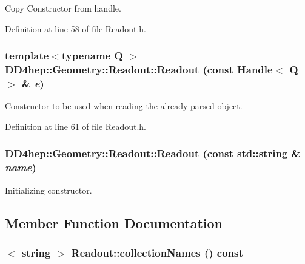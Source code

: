 Copy Constructor from handle. 

Definition at line 58 of file Readout.h.\hypertarget{class_d_d4hep_1_1_geometry_1_1_readout_a705069ce0237484eb95a9134df946698}{
\subsubsection[{Readout}]{\setlength{\rightskip}{0pt plus 5cm}template$<$typename Q $>$ DD4hep::Geometry::Readout::Readout (const {\bf Handle}$<$ Q $>$ \& {\em e})}}
\label{class_d_d4hep_1_1_geometry_1_1_readout_a705069ce0237484eb95a9134df946698}


Constructor to be used when reading the already parsed object. 

Definition at line 61 of file Readout.h.\hypertarget{class_d_d4hep_1_1_geometry_1_1_readout_ad8822b93a8d52c61b848323a5cea203d}{
\subsubsection[{Readout}]{\setlength{\rightskip}{0pt plus 5cm}DD4hep::Geometry::Readout::Readout (const std::string \& {\em name})}}
\label{class_d_d4hep_1_1_geometry_1_1_readout_ad8822b93a8d52c61b848323a5cea203d}


Initializing constructor. 

\subsection{Member Function Documentation}
\hypertarget{class_d_d4hep_1_1_geometry_1_1_readout_a1cf59ee8e3bd2e3ffb2bf0a50173fbcc}{
\subsubsection[{collectionNames}]{$<$ {\bf string} $>$ Readout::collectionNames () const}}
\label{class_d_d4hep_1_1_geometry_1_1_readout_a1cf59ee8e3bd2e3ffb2bf0a50173fbcc}


